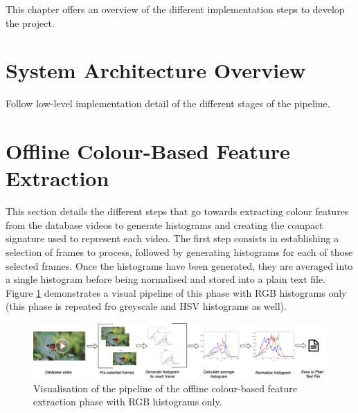 This chapter offers an overview of the different implementation steps to develop the project.

\section{System Architecture Overview}

Follow low-level implementation detail of the different stages of the pipeline.\\



\section{Offline Colour-Based Feature Extraction}

This section details the different steps that go towards extracting colour features from the database videos to generate histograms and creating the compact signature used to represent each video. The first step consists in establishing a selection of frames to process, followed by generating histograms for each of those selected frames. Once the histograms have been generated, they are averaged into a single histogram before being normalised and stored into a plain text file. Figure \ref{fig:implementation-rgb_average_histogram_pipeline} demonstrates a visual pipeline of this phase with RGB histograms only (this phase is repeated fro greyscale and HSV histograms as well). 

\begin{figure}[h] 
\centerline{\includegraphics[width=1.2\textwidth,center]{figures/implementation/rgb_average_histogram_pipeline.png}}
\caption{\label{fig:implementation-rgb_average_histogram_pipeline}Visualisation of the pipeline of the offline colour-based feature extraction phase with RGB histograms only.}
\end{figure}

